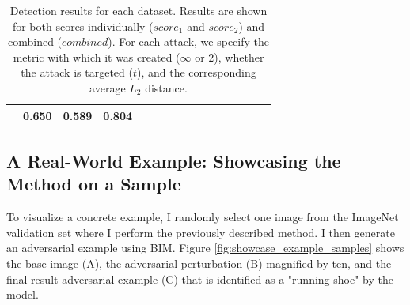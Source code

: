 \begin{table}[tph]
\begin{adjustbox}{angle=90}
{\begin{tabular}{c|c|cc|ccc|ccc|ccc|ccc}
                                                                        & 0.650
                                                                        & 0.589
                                                                        &
                \textbf{0.804}
                \\
                \bottomrule
            \end{tabular}
        }
    \end{adjustbox}
    \caption{Detection results for each dataset. Results are shown for both
        scores individually ($score_1$ and $score_2$) and combined ($combined$).
        For each attack, we specify the metric with which it was created
        ($\infty$ or $2$), whether the attack is targeted ($t$), and the
        corresponding average $L_2$ distance. \label{tab:detection_results}}
\end{table}

\pagebreak
\subsection{A Real-World Example: Showcasing the Method on a Sample}
To visualize a concrete example, I randomly select one image from the ImageNet
validation set where I perform the previously described method. I then generate
an adversarial example using BIM. Figure \ref{fig:showcase_example_samples}
shows the base image (A), the adversarial perturbation (B) magnified by ten, and
the final result adversarial example (C) that is identified as a "running shoe"
by the model.

